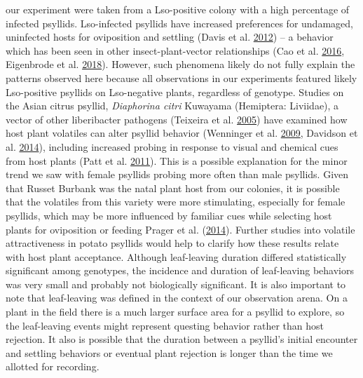 \documentclass[]{article}
\begin{document}
our experiment were taken from a Lso-positive colony with a high
percentage of infected psyllids. Lso-infected psyllids have increased
preferences for undamaged, uninfected hosts for oviposition and settling
(Davis et al. \protect\hyperlink{ref-Davis2012}{2012}) -- a behavior
which has been seen in other insect-plant-vector relationships (Cao et
al. \protect\hyperlink{ref-Cao2016}{2016}, Eigenbrode et al.
\protect\hyperlink{ref-Eigenbrode2018}{2018}). However, such phenomena
likely do not fully explain the patterns observed here because all
observations in our experiments featured likely Lso-positive psyllids on
Lso-negative plants, regardless of genotype. Studies on the Asian citrus
psyllid, \emph{Diaphorina citri} Kuwayama (Hemiptera: Liviidae), a
vector of other liberibacter pathogens (Teixeira et al.
\protect\hyperlink{ref-Teixeira2005}{2005}) have examined how host plant
volatiles can alter psyllid behavior (Wenninger et al.
\protect\hyperlink{ref-Wenninger2009}{2009}, Davidson et al.
\protect\hyperlink{ref-Davidson2014}{2014}), including increased probing
in response to visual and chemical cues from host plants (Patt et al.
\protect\hyperlink{ref-Patt2011}{2011}). This is a possible explanation
for the minor trend we saw with female psyllids probing more often than
male psyllids. Given that Russet Burbank was the natal plant host from
our colonies, it is possible that the volatiles from this variety were
more stimulating, especially for female psyllids, which may be more
influenced by familiar cues while selecting host plants for oviposition
or feeding Prager et al. (\protect\hyperlink{ref-Prager2014a}{2014}).
Further studies into volatile attractiveness in potato psyllids would
help to clarify how these results relate with host plant acceptance.
Although leaf-leaving duration differed statistically significant among
genotypes, the incidence and duration of leaf-leaving behaviors was very
small and probably not biologically significant. It is also important to
note that leaf-leaving was defined in the context of our observation
arena. On a plant in the field there is a much larger surface area for a
psyllid to explore, so the leaf-leaving events might represent questing
behavior rather than host rejection. It also is possible that the
duration between a psyllid's initial encounter and settling behaviors or
eventual plant rejection is longer than the time we allotted for
recording.
\end{document}
